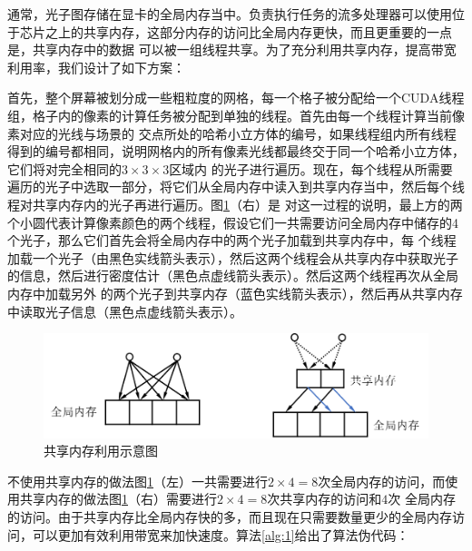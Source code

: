 \documentclass[UTF8]{ctexart}
\begin{document}
        通常，光子图存储在显卡的全局内存当中。负责执行任务的流多处理器可以使用位于芯片之上的共享内存，这部分内存的访问比全局内存更快，而且更重要的一点是，共享内存中的数据
        可以被一组线程共享。为了充分利用共享内存，提高带宽利用率，我们设计了如下方案：
        
        首先，整个屏幕被划分成一些粗粒度的网格，每一个格子被分配给一个CUDA线程组，格子内的像素的计算任务被分配到单独的线程。首先由每一个线程计算当前像素对应的光线与场景的
        交点所处的哈希小立方体的编号，如果线程组内所有线程得到的编号都相同，说明网格内的所有像素光线都最终交于同一个哈希小立方体，它们将对完全相同的$3\times3\times3$区域内
        的光子进行遍历。现在，每个线程从所需要遍历的光子中选取一部分，将它们从全局内存中读入到共享内存当中，然后每个线程对共享内存内的光子再进行遍历。图\ref{fig:5}（右）是
        对这一过程的说明，最上方的两个小圆代表计算像素颜色的两个线程，假设它们一共需要访问全局内存中储存的4个光子，那么它们首先会将全局内存中的两个光子加载到共享内存中，每
        个线程加载一个光子（由黑色实线箭头表示），然后这两个线程会从共享内存中获取光子的信息，然后进行密度估计（黑色点虚线箭头表示）。然后这两个线程再次从全局内存中加载另外
        的两个光子到共享内存（蓝色实线箭头表示），然后再从共享内存中读取光子信息（黑色点虚线箭头表示）。
        
        \begin{figure}[H]
        \centering
        \includegraphics[scale=0.7]{pic/SharedMemory.png}
        \caption{共享内存利用示意图}
        \label{fig:5}
        \end{figure}
        
        不使用共享内存的做法图\ref{fig:5}（左）一共需要进行$2\times4=8$次全局内存的访问，而使用共享内存的做法图\ref{fig:5}（右）需要进行$2\times4=8$次共享内存的访问和$4$次
        全局内存的访问。由于共享内存比全局内存快的多，而且现在只需要数量更少的全局内存访问，可以更加有效利用带宽来加快速度。算法\ref{alg:1}给出了算法伪代码：
        
        \renewcommand{\algorithmicrequire}{\textbf{Input:}} 
        \renewcommand{\algorithmicensure}{\textbf{Output:}}
        
\end{document}
